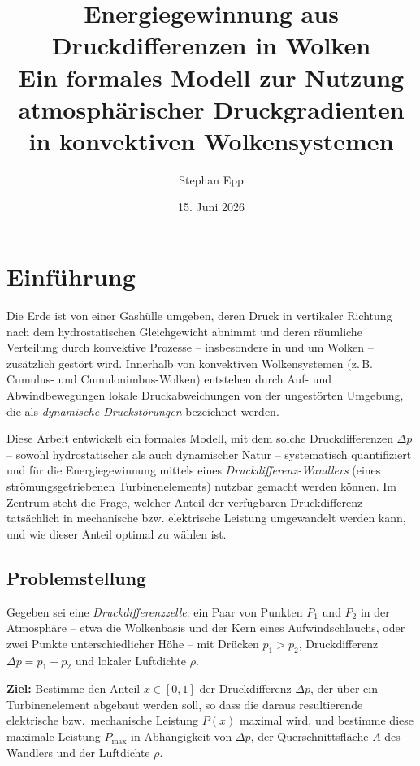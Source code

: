 ﻿\documentclass[a4paper,12pt]{article}
\title{Energiegewinnung aus Druckdifferenzen in Wolken\\[0.3em]
\large Ein formales Modell zur Nutzung atmosphärischer Druckgradienten\\ in konvektiven Wolkensystemen}
\author{Stephan Epp}
\date{15. Juni 2026}
\theoremstyle{definition}
\begin{document}
\maketitle

\tableofcontents
\newpage

\section{Einführung}

Die Erde ist von einer Gashülle umgeben, deren Druck in vertikaler Richtung
nach dem hydrostatischen Gleichgewicht abnimmt und deren räumliche
Verteilung durch konvektive Prozesse -- insbesondere in und um Wolken --
zusätzlich gestört wird. Innerhalb von konvektiven Wolkensystemen (z.\,B.
Cumulus- und Cumulonimbus-Wolken) entstehen durch Auf- und
Abwindbewegungen lokale Druckabweichungen von der ungestörten Umgebung,
die als \emph{dynamische Druckstörungen} bezeichnet werden.

Diese Arbeit entwickelt ein formales Modell, mit dem solche
Druckdifferenzen $\Delta p$ -- sowohl hydrostatischer als auch dynamischer
Natur -- systematisch quantifiziert und für die Energiegewinnung mittels
eines \emph{Druckdifferenz-Wandlers} (eines strömungsgetriebenen
Turbinenelements) nutzbar gemacht werden können. Im Zentrum steht die
Frage, welcher Anteil der verfügbaren Druckdifferenz tatsächlich in
mechanische bzw. elektrische Leistung umgewandelt werden kann, und wie
dieser Anteil optimal zu wählen ist.

\subsection{Problemstellung}

Gegeben sei eine \emph{Druckdifferenzzelle}: ein Paar von Punkten $P_1$
und $P_2$ in der Atmosphäre -- etwa die Wolkenbasis und der Kern eines
Aufwindschlauchs, oder zwei Punkte unterschiedlicher Höhe -- mit Drücken
$p_1 > p_2$, Druckdifferenz $\Delta p = p_1 - p_2$ und lokaler Luftdichte
$\rho$.

\textbf{Ziel:} Bestimme den Anteil $x \in [0,1]$ der Druckdifferenz
$\Delta p$, der über ein Turbinenelement abgebaut werden soll, so dass die
daraus resultierende elektrische bzw.\ mechanische Leistung $P(x)$ maximal
wird, und bestimme diese maximale Leistung $P_{\max}$ in Abhängigkeit von
$\Delta p$, der Querschnittsfläche $A$ des Wandlers und der Luftdichte
$\rho$.
\end{document}
